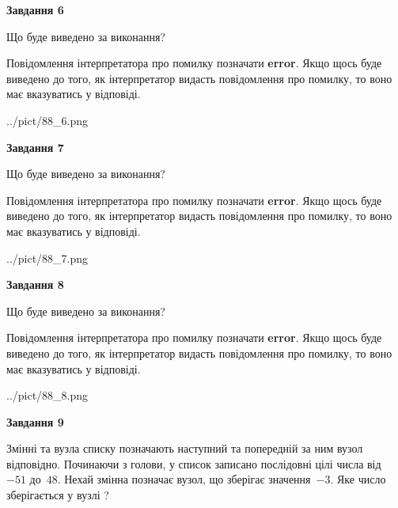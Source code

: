 \documentclass[12pt, ukrainian]{article}
\begin{document}
{\begin {large}
{\begin {center}\textbf{Завдання 6}\end {center}}\par
Що буде виведено за виконання?

Повідомлення інтерпретатора про помилку позначати \textbf{error}.
Якщо щось буде виведено до того, як інтерпретатор видасть повідомлення про помилку, 
то воно має вказуватись у відповіді. \par


\begin{center}
	{../pict/88_6.png}
\end{center}
\newpage

{\begin {center}\textbf{Завдання 7}\end {center}}\par
Що буде виведено за виконання?

Повідомлення інтерпретатора про помилку позначати \textbf{error}.
Якщо щось буде виведено до того, як інтерпретатор видасть повідомлення про помилку, 
то воно має вказуватись у відповіді. \par


\begin{center}
	{../pict/88_7.png}
\end{center}
\newpage

{\begin {center}\textbf{Завдання 8}\end {center}}\par
Що буде виведено за виконання?

Повідомлення інтерпретатора про помилку позначати \textbf{error}.
Якщо щось буде виведено до того, як інтерпретатор видасть повідомлення про помилку, 
то воно має вказуватись у відповіді. \par


\begin{center}
	{../pict/88_8.png}
\end{center}
\newpage

{\begin {center}\textbf{Завдання 9}\end {center}}\par
Змінні  та  вузла списку позначають наступний та попередній за ним вузол відповідно. Починаючи з голови, у список записано послідовні цілі числа від~$-51$ до~$48$. Нехай змінна  позначає вузол, що зберігає значення~$-3$.
Яке число зберігається у вузлі  ?\par
\newpage


\end{large}}
\end{document}
